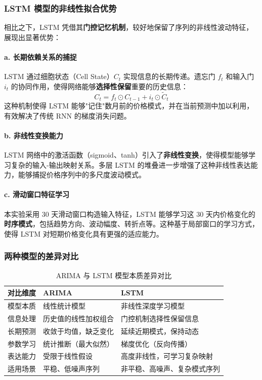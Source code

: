 \documentclass[a4paper]{article}
\begin{document}
\subsubsection{LSTM 模型的非线性拟合优势}
相比之下，LSTM 凭借其\textbf{门控记忆机制}，较好地保留了序列的非线性波动特征，展现出显著优势：
\paragraph{a. 长期依赖关系的捕捉}

LSTM 通过细胞状态（Cell State）$C_t$ 实现信息的长期传递。遗忘门 $f_t$ 和输入门 $i_t$ 的协同作用，使得网络能够\textbf{选择性保留}重要的历史信息：
\[
C_t = f_t \odot C_{t-1} + i_t \odot \tilde{C}_t
\]
这种机制使得 LSTM 能够"记住"数月前的价格模式，并在当前预测中加以利用，有效解决了传统 RNN 的梯度消失问题。

\paragraph{b. 非线性变换能力}
LSTM 网络中的激活函数（sigmoid、tanh）引入了\textbf{非线性变换}，使得模型能够学习复杂的输入-输出映射关系。多层 LSTM 的堆叠进一步增强了这种非线性表达能力，能够捕捉价格序列中的多尺度波动模式。

\paragraph{c. 滑动窗口特征学习}
本实验采用 30 天滑动窗口构造输入特征，LSTM 能够学习这 30 天内价格变化的\textbf{时序模式}，包括趋势方向、波动幅度、转折点等。这种基于局部窗口的学习方式，使得 LSTM 对短期价格变化具有更强的适应能力。

\subsubsection{两种模型的差异对比}

\begin{table}[H]
    \centering
    \caption{ARIMA 与 LSTM 模型本质差异对比}
    \label{tab:comparison}
    \begin{tabular}{p{3cm}p{5cm}p{5cm}}
        \toprule
        \textbf{对比维度} & \textbf{ARIMA} & \textbf{LSTM} \\
        \midrule
        模型本质 & 线性统计模型 & 非线性深度学习模型 \\
        信息处理 & 历史值的线性加权组合 & 门控机制选择性保留信息 \\
        长期预测 & 收敛于均值，缺乏变化 & 延续近期模式，保持动态 \\
        参数学习 & 统计推断（最大似然） & 梯度优化（反向传播） \\
        表达能力 & 受限于线性假设 & 高度非线性，可学习复杂映射 \\
        适用场景 & 平稳、低噪声序列 & 非平稳、高噪声、复杂模式序列 \\
        \bottomrule
    \end{tabular}
\end{table}
\end{document}
